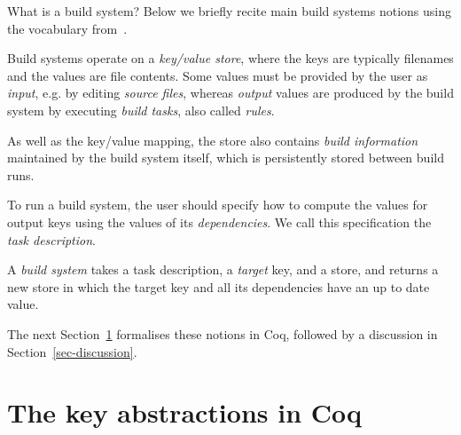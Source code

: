 \documentclass[sigplan,review]{acmart}\settopmatter{printfolios=true,printccs=false,printacmref=false}
\begin{document}
What is a build system? Below we briefly recite main build systems notions
using the vocabulary from~\cite{Mokhov2018icfp}.

Build systems operate on a \emph{key/value store}, where the keys are typically
filenames and the values are file contents. Some values must be provided by
the user as \emph{input}, e.g. by editing \emph{source files}, whereas
\emph{output} values are produced by the build system by executing \emph{build
tasks}, also called \emph{rules}.

As well as the key/value mapping, the store also contains \emph{build
information} maintained by the build system itself, which is persistently stored
between build runs.

To run a build system, the user should specify how to compute the values for
output keys using the values of its \emph{dependencies}. We call this
specification the \emph{task description}.

A \emph{build system} takes a task description, a \emph{target} key, and a
store, and returns a new store in which the target key and all its dependencies
have an up to date value.

The next Section~\ref{sec-abstractions} formalises these notions in Coq,
followed by a discussion in Section~\ref{sec-discussion}.

\section{The key abstractions in Coq}\label{sec-abstractions}
\end{document}
